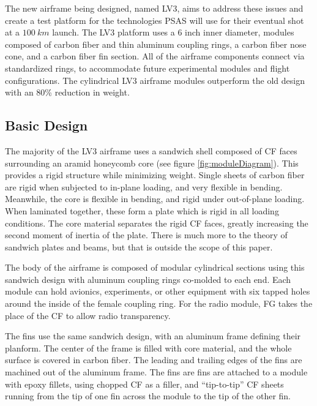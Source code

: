 \documentclass{aiaa-tc}%
\newcommand{\weightReduction}{80\%}
\begin{document}
The new airframe being designed, named LV3, aims to address these issues and create a test platform for the technologies PSAS will use for their eventual shot at a $\SI{100}{km}$ launch. The LV3 platform uses a 6 inch inner diameter, modules composed of carbon fiber and thin aluminum coupling rings, a carbon fiber nose cone, and a carbon fiber fin section. All of the airframe components connect via standardized rings, to accommodate future experimental modules and flight configurations.
The cylindrical LV3 airframe modules outperform the old design with an \weightReduction{} reduction in weight.

\subsection{Basic Design}

The majority of the LV3 airframe uses a sandwich shell composed of CF faces surrounding an aramid honeycomb core (see figure \ref{fig:moduleDiagram}). This provides a rigid structure while minimizing weight. 
Single sheets of carbon fiber are rigid when subjected to in-plane loading, and very flexible in bending. Meanwhile, the core is flexible in bending, and rigid under out-of-plane loading. 
When laminated together, these form a plate which is rigid in all loading conditions. The core material separates the rigid CF faces, greatly increasing the second moment of inertia of the plate. 
There is much more to the theory of sandwich plates and beams, but that is outside the scope of this paper. 

The body of the airframe is composed of modular cylindrical sections using this sandwich design with aluminum coupling rings co-molded to each end.
Each module can hold avionics, experiments, or other equipment with six tapped holes around the inside of the female coupling ring. 
For the radio module, FG takes the place of the CF to allow radio transparency.

The fins use the same sandwich design, with an aluminum frame defining their planform. The center of the frame is filled with core material, and the whole surface is covered in carbon fiber. 
The leading and trailing edges of the fins are machined out of the aluminum frame. 
The fins are fins are attached to a module with epoxy fillets, using chopped CF as a filler, and ``tip-to-tip'' CF sheets running from the tip of one fin across the module to the tip of the other fin.
\end{document}
